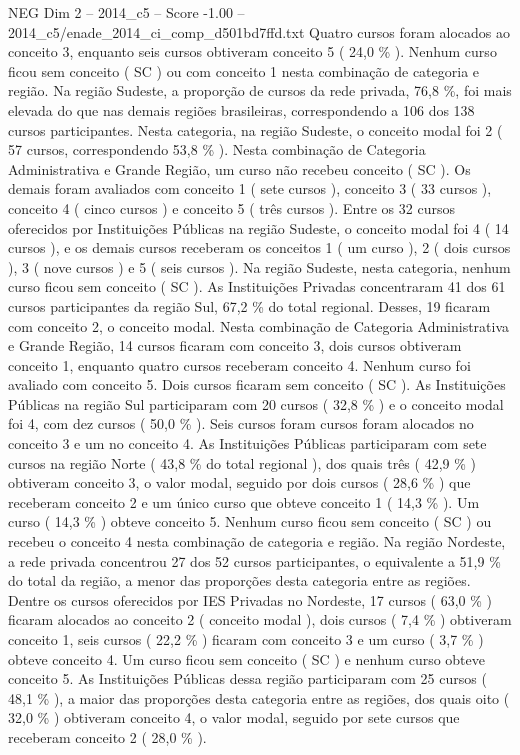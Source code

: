 \begin{textsample}{NEG Dim 2 – 2014\_c5 – Score -1.00 – 2014\_c5/enade\_2014\_ci\_comp\_d501bd7ffd.txt}
Quatro cursos foram alocados ao conceito 3, enquanto seis cursos obtiveram conceito 5 ( 24,0 \% ).
Nenhum curso ficou sem conceito ( SC ) ou com conceito 1 nesta combinação de categoria e região.
Na região Sudeste, a proporção de cursos da rede privada, 76,8 \%, foi mais elevada do que nas demais regiões brasileiras, correspondendo a 106 dos 138 cursos participantes.
Nesta categoria, na região Sudeste, o conceito modal foi 2 ( 57 cursos, correspondendo 53,8 \% ).
Nesta combinação de Categoria Administrativa e Grande Região, um curso não recebeu conceito ( SC ).
Os demais foram avaliados com conceito 1 ( sete cursos ), conceito 3 ( 33 cursos ), conceito 4 ( cinco cursos ) e conceito 5 ( três cursos ).
Entre os 32 cursos oferecidos por Instituições Públicas na região Sudeste, o conceito modal foi 4 ( 14 cursos ), e os demais cursos receberam os conceitos 1 ( um curso ), 2 ( dois cursos ), 3 ( nove cursos ) e 5 ( seis cursos ).
Na região Sudeste, nesta categoria, nenhum curso ficou sem conceito ( SC ).
As Instituições Privadas concentraram 41 dos 61 cursos participantes da região Sul, 67,2 \% do total regional.
Desses, 19 ficaram com conceito 2, o conceito modal.
Nesta combinação de Categoria Administrativa e Grande Região, 14 cursos ficaram com conceito 3, dois cursos obtiveram conceito 1, enquanto quatro cursos receberam conceito 4.
Nenhum curso foi avaliado com conceito 5.
Dois cursos ficaram sem conceito ( SC ).
As Instituições Públicas na região Sul participaram com 20 cursos ( 32,8 \% ) e o conceito modal foi 4, com dez cursos ( 50,0 \% ).
Seis cursos foram cursos foram alocados no conceito 3 e um no conceito 4.
As Instituições Públicas participaram com sete cursos na região Norte ( 43,8 \% do total regional ), dos quais três ( 42,9 \% ) obtiveram conceito 3, o valor modal, seguido por dois cursos ( 28,6 \% ) que receberam conceito 2 e um único curso que obteve conceito 1 ( 14,3 \% ).
Um curso ( 14,3 \% ) obteve conceito 5.
Nenhum curso ficou sem conceito ( SC ) ou recebeu o conceito 4 nesta combinação de categoria e região.
Na região Nordeste, a rede privada concentrou 27 dos 52 cursos participantes, o equivalente a 51,9 \% do total da região, a menor das proporções desta categoria entre as regiões.
Dentre os cursos oferecidos por IES Privadas no Nordeste, 17 cursos ( 63,0 \% ) ficaram alocados ao conceito 2 ( conceito modal ), dois cursos ( 7,4 \% ) obtiveram conceito 1, seis cursos ( 22,2 \% ) ficaram com conceito 3 e um curso ( 3,7 \% ) obteve conceito 4.
Um curso ficou sem conceito ( SC ) e nenhum curso obteve conceito 5.
As Instituições Públicas dessa região participaram com 25 cursos ( 48,1 \% ), a maior das proporções desta categoria entre as regiões, dos quais oito ( 32,0 \% ) obtiveram conceito 4, o valor modal, seguido por sete cursos que receberam conceito 2 ( 28,0 \% ).

\end{textsample}
